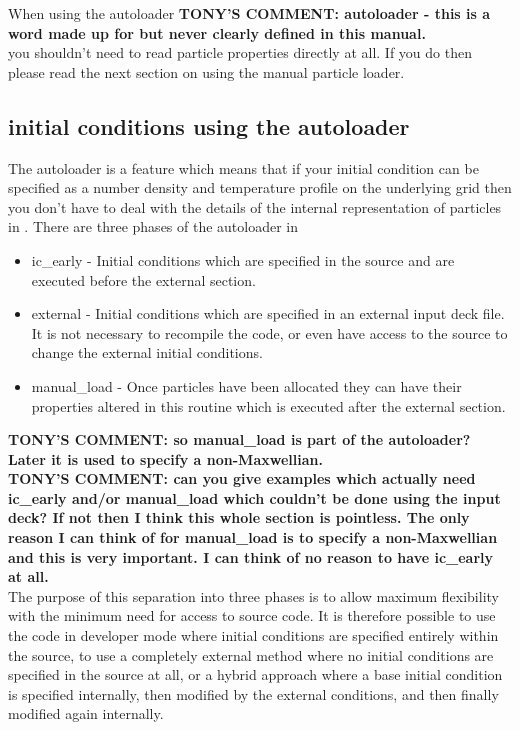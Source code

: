 \documentclass[12pt,a4paper]{article}
\newcommand{\EPOCH}{{\color{warwickdark}\fontfamily{phv}\selectfont{EPOCH}}}
\newcommand{\tony}[1]{{\color{warwickred} \bf{TONY'S COMMENT:} \bf{#1}}\\}
\begin{document}
When using the autoloader
\tony{autoloader - this is a word made up for {\EPOCH} but never
clearly defined in this manual.}
you shouldn't need to read particle properties
directly at all. If you do then please read the next section on using the
manual particle loader.

\subsection{{\EPOCH} initial conditions using the autoloader}
The {\EPOCH} autoloader is a feature which means that if your initial condition
can be specified as a number density and temperature profile on the underlying
grid then you don't have to deal with the details of the internal
representation of particles in {\EPOCH}. There are three phases of the
autoloader in {\EPOCH}

\begin{itemize}
\item ic\_early - Initial conditions which are specified in the {\EPOCH}
  source and are executed before the external section.
\item external - Initial conditions which are specified in an external input
  deck file. It is not necessary to recompile the code, or even have
  access to the source to change the external initial conditions.
\item manual\_load - Once particles have been allocated they can have their
  properties altered in this routine which is executed after the external
  section.
\end{itemize}
\tony{so manual\_load is part of the autoloader? Later it is used to specify
a non-Maxwellian.}
\tony{can you give examples which actually need ic\_early and/or manual\_load
which couldn't be done using the input deck? If not then I think this whole
 section is pointless. The only reason I can think of for manual\_load is
 to specify a non-Maxwellian and this is very important. I can think of
 no reason to have ic\_early at all.}

The purpose of this separation into three phases is to allow maximum
flexibility with the minimum need for access to source code. It is therefore
possible to use the code in developer mode where initial conditions are
specified entirely within the {\EPOCH} source, to use a completely external
method where no initial conditions are specified in the {\EPOCH} source at all,
or a hybrid approach where a base initial condition is specified internally,
then modified by the external conditions, and then finally modified again
internally.
\end{document}

